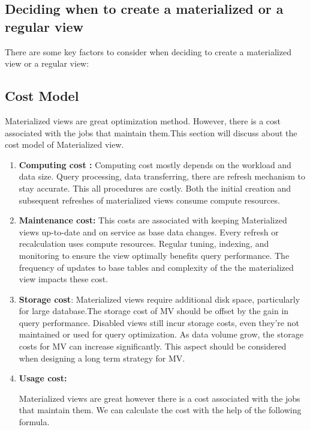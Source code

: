  
\subsection{Deciding when to create a materialized or a regular view}\vspace{0.4cm}

There are some key factors to consider when deciding to create a materialized view or a regular view:\vspace{0.4cm}




 \subsection{Cost Model}
Materialized views are great optimization method. However, there is a cost associated with the jobs that maintain them.This section will discuss about the cost model of Materialized view.\vspace{.4cm}
 \begin{enumerate}[label=\alph*)]
    \item \textbf{Computing cost :} Computing cost mostly depends on the workload and data size. Query processing, data transferring, there are refresh mechanism to stay accurate. This all procedures are costly. Both the initial creation and subsequent refreshes of materialized views consume compute resources.
    \item \textbf{Maintenance cost:} This costs are associated with keeping Materialized views up-to-date and on service as base data changes. Every refresh or recalculation uses compute resources. Regular tuning, indexing, and monitoring to ensure the view optimally benefits query performance. The frequency of updates to base tables and complexity of the the materialized view impacts these cost. 
    \item \textbf{Storage cost}: Materialized views require additional disk space, particularly for large database.The storage cost of MV should be offset by the gain in query performance. Disabled views  still incur storage costs, even  they're not maintained or used for query optimization. As data volume grow, the storage costs for MV can increase significantly. This  aspect should be considered when designing a long term strategy for MV. 
    
    \item \textbf{Usage cost:}\vspace{.3cm}
    
    Materialized views are great however there is a cost associated with the jobs that maintain them. We can calculate the cost with the help of the following formula.\cite{10.1145/2206869.2206874}

    
  
\end{enumerate}




